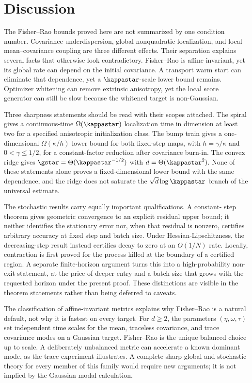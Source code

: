 \section{Discussion}
\label{sec:discussion}

The Fisher--Rao bounds proved here are not summarized by one condition number.
Covariance underdispersion, global nonquadratic localization, and local
mean--covariance coupling are three different effects.  Their separation
explains several facts that otherwise look contradictory.  Fisher--Rao is
affine invariant, yet its global rate can depend on the initial covariance.
A transport warm start can eliminate that dependence, yet a
\(\kappastar\)-scale lower bound remains.  Optimizer whitening can remove
extrinsic anisotropy, yet the local score generator can still be slow because
the whitened target is non-Gaussian.

Three sharpness statements should be read with their scopes attached.  The
spiral gives a continuous-time \(\Omega(\kappastar)\) localization time in
dimension at least two for a specified anisotropic initialization class.  The
bump train gives a one-dimensional \(\Omega(\kappa/h)\) lower bound for both
fixed-step maps, with \(h=\gamma/\kappa\) and
\(0<\gamma\leq1/2\), for a constant-factor reduction after covariance
burn-in.  The convex ridge gives
\(\gstar=\Theta(\kappastar^{-1/2})\) with
\(d=\Theta(\kappastar^2)\).  None of these statements alone proves a
fixed-dimensional lower bound with the same dependence, and the ridge does not
saturate the \(\sqrt d\log\kappastar\) branch of the universal estimate.

The stochastic results carry equally important qualifications.  A constant-
step theorem gives geometric convergence to an explicit residual upper bound;
it neither identifies the stationary error nor, when that residual is nonzero,
certifies arbitrary accuracy at fixed step and batch size.  Under
Hessian-Lipschitzness, the decreasing-step result instead certifies decay to
zero at an \(O(1/N)\) rate.  Locally,
contraction is first proved for the process killed at the boundary of a
certified region.  A separate finite-horizon argument turns this into a
high-probability non-exit statement, at the price of deeper entry and a batch
size that grows with the requested horizon under the present proof.  These
distinctions are visible in the theorem statements rather than being deferred
to caveats.

The classification of affine-invariant metrics explains why Fisher--Rao is a
natural default, not why it is fastest on every target.  For \(d\geq2\), the
parameters \((\eta,\omega,\tau)\) set independent time scales for the mean,
traceless covariance, and trace covariance modes on a Gaussian target.
Fisher--Rao is the unique balanced choice up to scale.  A deliberately
unbalanced metric can accelerate a known dominant mode, as the trace experiment
illustrates.  A complete sharp global and stochastic theory for every member of
this family would require new arguments; it is not implied by the Gaussian
modal calculation.


